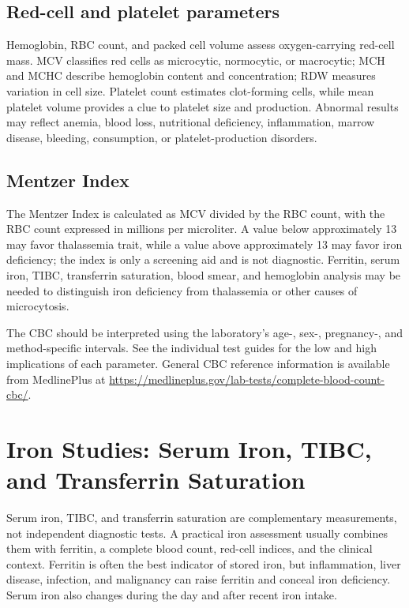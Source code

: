 \documentclass[11pt,openany]{book}
\begin{document}
\subsection*{Red-cell and platelet parameters}
Hemoglobin, RBC count, and packed cell volume assess oxygen-carrying red-cell
mass. MCV classifies red cells as microcytic, normocytic, or macrocytic; MCH and
MCHC describe hemoglobin content and concentration; RDW measures variation in
cell size. Platelet count estimates clot-forming cells, while mean platelet
volume provides a clue to platelet size and production. Abnormal results may
reflect anemia, blood loss, nutritional deficiency, inflammation, marrow
disease, bleeding, consumption, or platelet-production disorders.

\subsection*{Mentzer Index}
The Mentzer Index is calculated as MCV divided by the RBC count, with the RBC
count expressed in millions per microliter. A value below approximately 13 may
favor thalassemia trait, while a value above approximately 13 may favor iron
deficiency; the index is only a screening aid and is not diagnostic. Ferritin,
serum iron, TIBC, transferrin saturation, blood smear, and hemoglobin analysis
may be needed to distinguish iron deficiency from thalassemia or other causes
of microcytosis.

The CBC should be interpreted using the laboratory's age-, sex-, pregnancy-, and
method-specific intervals. See the individual test guides for the low and high
implications of each parameter. General CBC reference information is available
from MedlinePlus at \url{https://medlineplus.gov/lab-tests/complete-blood-count-cbc/}.

\section{Iron Studies: Serum Iron, TIBC, and Transferrin Saturation}

Serum iron, TIBC, and transferrin saturation are complementary measurements,
not independent diagnostic tests. A practical iron assessment usually combines
them with ferritin, a complete blood count, red-cell indices, and the clinical
context. Ferritin is often the best indicator of stored iron, but inflammation,
liver disease, infection, and malignancy can raise ferritin and conceal iron
deficiency. Serum iron also changes during the day and after recent iron intake.
\end{document}
